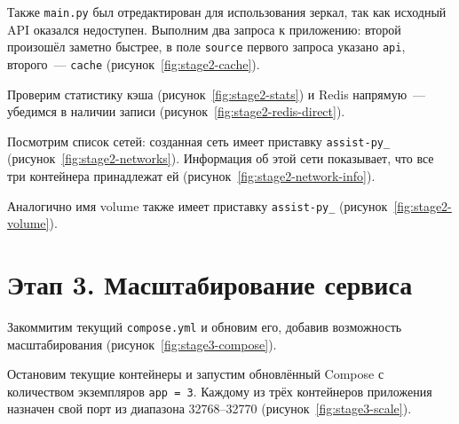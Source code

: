 
Также \texttt{main.py} был отредактирован для использования зеркал, так
как исходный API оказался недоступен. Выполним два запроса к приложению:
второй произошёл заметно быстрее, в поле \texttt{source} первого запроса
указано \texttt{api}, второго~--- \texttt{cache}
(рисунок~\ref{fig:stage2-cache}).


Проверим статистику кэша (рисунок~\ref{fig:stage2-stats}) и Redis
напрямую~--- убедимся в наличии записи
(рисунок~\ref{fig:stage2-redis-direct}).


Посмотрим список сетей: созданная сеть имеет приставку
\texttt{assist-py\_} (рисунок~\ref{fig:stage2-networks}). Информация об
этой сети показывает, что все три контейнера принадлежат ей
(рисунок~\ref{fig:stage2-network-info}).


Аналогично имя volume также имеет приставку \texttt{assist-py\_}
(рисунок~\ref{fig:stage2-volume}).


\section{Этап 3. Масштабирование сервиса}

Закоммитим текущий \texttt{compose.yml} и обновим его, добавив возможность
масштабирования (рисунок~\ref{fig:stage3-compose}).


Остановим текущие контейнеры и запустим обновлённый Compose с количеством
экземпляров \texttt{app = 3}. Каждому из трёх контейнеров приложения
назначен свой порт из диапазона 32768--32770
(рисунок~\ref{fig:stage3-scale}).


